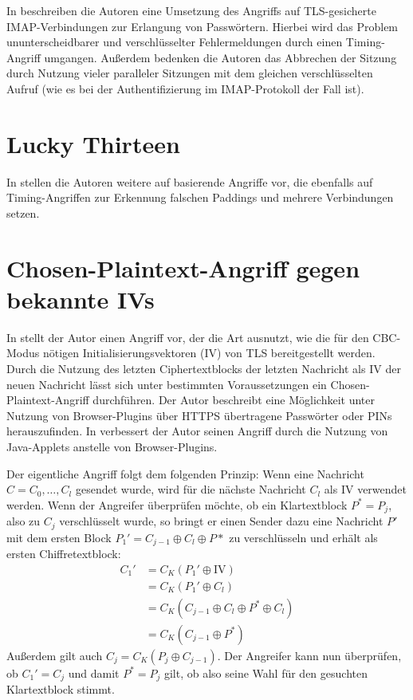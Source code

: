 In \cite{canvel03} beschreiben die Autoren eine Umsetzung des Angriffs auf TLS-gesicherte IMAP-Verbindungen zur Erlangung von Passwörtern. Hierbei wird das Problem ununterscheidbarer und verschlüsselter Fehlermeldungen durch einen Timing-Angriff umgangen. Außerdem bedenken die Autoren das Abbrechen der Sitzung durch Nutzung vieler paralleler Sitzungen mit dem gleichen verschlüsselten Aufruf (wie es bei der Authentifizierung im IMAP-Protokoll der Fall ist).


\section{Lucky Thirteen}

In \cite{paterson13} stellen die Autoren weitere auf \cite{vaudenay02} basierende Angriffe vor, die ebenfalls auf Timing-Angriffen zur Erkennung falschen Paddings und mehrere Verbindungen setzen.

\section{Chosen-Plaintext-Angriff gegen bekannte IVs}

\label{sec_known_ivs}

In \cite{bard04} stellt der Autor einen Angriff vor, der die Art ausnutzt, wie die für den CBC-Modus nötigen Initialisierungsvektoren (IV) von TLS bereitgestellt werden. Durch die Nutzung des letzten Ciphertextblocks der letzten Nachricht als IV der neuen Nachricht lässt sich unter bestimmten Voraussetzungen ein Chosen-Plaintext-Angriff durchführen. Der Autor beschreibt eine Möglichkeit unter Nutzung von Browser-Plugins über HTTPS übertragene Passwörter oder PINs herauszufinden. In \cite{bard06} verbessert der Autor seinen Angriff durch die Nutzung von Java-Applets anstelle von Browser-Plugins.

Der eigentliche Angriff folgt dem folgenden Prinzip: Wenn eine Nachricht \(C = C_0,\dots,C_l\) gesendet wurde, wird für die nächste Nachricht \(C_l\) als IV verwendet werden. Wenn der Angreifer überprüfen möchte, ob ein Klartextblock \(P^*=P_j\), also zu \(C_j\) verschlüsselt wurde, so bringt er einen Sender dazu eine Nachricht \(P'\) mit dem ersten Block \(P_1'=C_{j-1} \oplus C_l \oplus P*\) zu verschlüsseln und erhält als ersten Chiffretextblock:
\begin{align*}
C_1' &= C_{K}(P_1' \oplus \text{IV})\\
	&= C_{K}(P_1' \oplus C_l)\\
	&= C_{K}(C_{j-1} \oplus C_l \oplus P^* \oplus C_l)\\
	&= C_{K}(C_{j-1} \oplus P^*)
\end{align*}
Außerdem gilt auch \(C_j= C_{K}(P_j \oplus C_{j-1})\). Der Angreifer kann nun überprüfen, ob \(C_1'=C_j\) und damit \(P^*=P_j\) gilt, ob also seine Wahl für den gesuchten Klartextblock stimmt.

